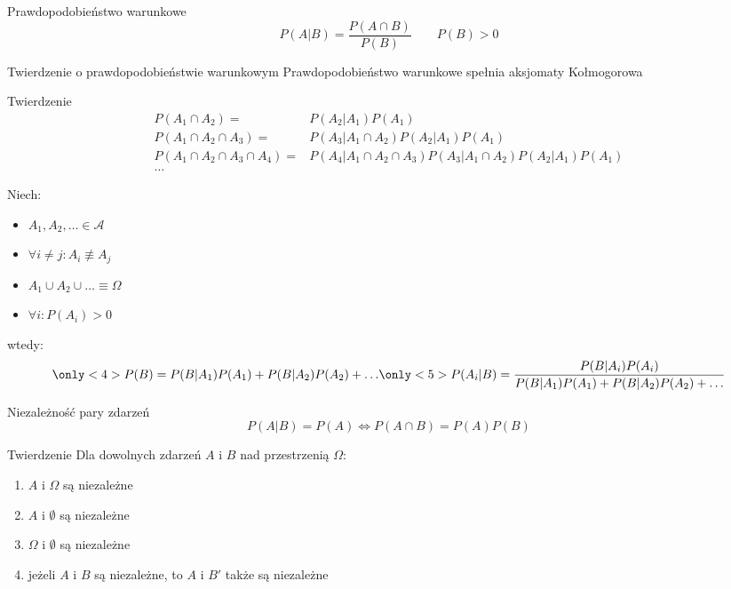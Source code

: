 \documentclass{beamer}
\begin{document}
\begin{frame}{Prawdopodobieństwo warunkowe}
\[ P(A|B)=\frac{P(A\cap B)}{P(B)} \qquad P(B)>0 \]
{
\begin{block}{Twierdzenie o prawdopodobieństwie warunkowym}
Prawdopodobieństwo warunkowe spełnia aksjomaty Kołmogorowa
\end{block}
}
{
	\begin{block}{Twierdzenie}
	\begin{align*}
		P(A_1 \cap A_2)= & P(A_2|A_1)P(A_1) \\
		P(A_1 \cap A_2 \cap A_3)=& P(A_3|A_1\cap A_2)P(A_2|A_1)P(A_1) \\
		P(A_1 \cap A_2 \cap A_3\cap A_4)=& P(A_4|A_1\cap A_2\cap A_3) P(A_3|A_1\cap A_2)P(A_2|A_1)P(A_1) \\
		\ldots
	\end{align*}
	\end{block}
}
{
\begin{block}{}
Niech:
\begin{itemize}
\item $A_1, A_2, \ldots \in \mathcal{A}$
\item $\forall i\neq j\colon A_i\not\equiv A_j$
\item $A_1\cup A_2\cup \ldots \equiv \Omega$
\item $\forall i\colon P(A_i)>0$
\end{itemize}
wtedy:
\[
\only<4>{P(B)=P(B|A_1)P(A_1)+P(B|A_2)P(A_2)+\ldots}
\only<5>{P(A_i|B)=\frac{P(B|A_i)P(A_i)}{P(B|A_1)P(A_1)+P(B|A_2)P(A_2)+\ldots}}
\]
\end{block}
}
\end{frame}
\begin{frame}{Niezależność pary zdarzeń}
\[ P(A|B)=P(A) \iff P(A\cap B)=P(A)P(B) \]
{
\begin{block}{Twierdzenie}
Dla dowolnych zdarzeń $A$ i $B$ nad przestrzenią $\Omega$:
\begin{enumerate}
\item $A$ i $\Omega$ są niezależne
\item $A$ i $\emptyset$ są niezależne
\item $\Omega$ i $\emptyset$ są niezależne
\item jeżeli $A$ i $B$ są niezależne, to $A$ i $B'$ także są niezależne
\end{enumerate}
\end{block}
}
\end{frame}
\end{document}
